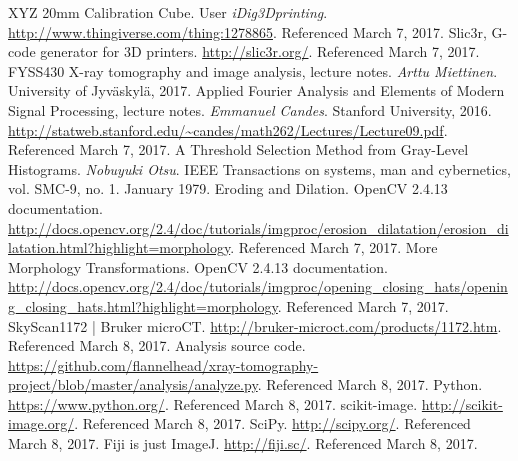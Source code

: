 \documentclass[a4paper,twoside,12pt]{article}
\begin{document}
\clearpage

\begin{thebibliography}{9}
     XYZ 20mm Calibration Cube. User \emph{iDig3Dprinting}. \url{http://www.thingiverse.com/thing:1278865}. Referenced March 7, 2017.
     Slic3r, G-code generator for 3D printers. \url{http://slic3r.org/}. Referenced March 7, 2017.
     FYSS430 X-ray tomography and image analysis, lecture notes. \emph{Arttu Miettinen}. University of Jyväskylä, 2017.
     Applied Fourier Analysis and Elements of Modern Signal Processing, lecture notes. \emph{Emmanuel Candes}. Stanford University, 2016. \url{http://statweb.stanford.edu/~candes/math262/Lectures/Lecture09.pdf}. Referenced March 7, 2017.
     A Threshold Selection Method from Gray-Level Histograms. \emph{Nobuyuki Otsu}. IEEE Transactions on systems, man and cybernetics, vol. SMC-9, no. 1. January 1979.
     Eroding and Dilation. OpenCV 2.4.13 documentation. \url{http://docs.opencv.org/2.4/doc/tutorials/imgproc/erosion_dilatation/erosion_dilatation.html?highlight=morphology}. Referenced March 7, 2017.
     More Morphology Transformations. OpenCV 2.4.13 documentation. \url{http://docs.opencv.org/2.4/doc/tutorials/imgproc/opening_closing_hats/opening_closing_hats.html?highlight=morphology}. Referenced March 7, 2017.
     SkyScan1172 | Bruker microCT. \url{http://bruker-microct.com/products/1172.htm}. Referenced March 8, 2017.
     Analysis source code. \url{https://github.com/flannelhead/xray-tomography-project/blob/master/analysis/analyze.py}. Referenced March 8, 2017.
     Python. \url{https://www.python.org/}. Referenced March 8, 2017.
     scikit-image. \url{http://scikit-image.org/}. Referenced March 8, 2017.
     SciPy. \url{http://scipy.org/}. Referenced March 8, 2017.
     Fiji is just ImageJ. \url{http://fiji.sc/}. Referenced March 8, 2017.
\end{thebibliography}
\end{document}
